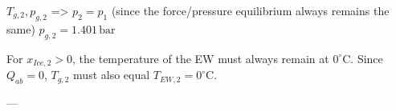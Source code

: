 \( T_{g,2}, p_{g,2} \)  
=> \( p_2 = p_1 \) (since the force/pressure equilibrium always remains the same)  
\( p_{g,2} = 1.401 \, \text{bar} \)  

For \( x_{Ice,2} > 0 \), the temperature of the EW must always remain at \( 0^\circ \text{C} \).  
Since \( Q_{ab} = 0 \), \( T_{g,2} \) must also equal \( T_{EW,2} = 0^\circ \text{C} \).  

---